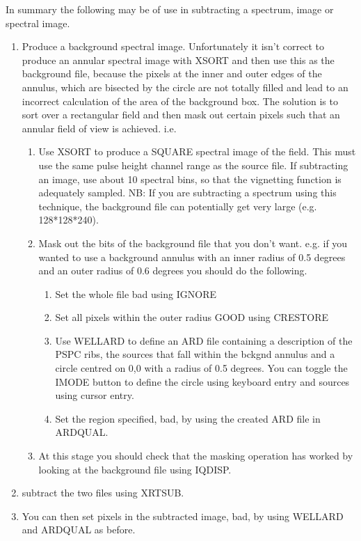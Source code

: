 \documentclass{book}
\renewcommand{\_}{{\tt\char'137}}     %
\begin{document}
In summary the following may be of use in subtracting a spectrum,
image or spectral image.
 
 
\begin{enumerate}
\item Produce a background spectral image. Unfortunately it isn't
correct to produce an annular spectral image with XSORT and then
use this as the background file, because the pixels at the inner and
outer edges of the annulus, which are bisected by the circle are
not totally filled and lead to an incorrect calculation of the area
of the background box. The solution is to sort over a rectangular
field and then mask out certain pixels such that an annular field
of view is achieved. i.e.
 
\begin{enumerate}
\item Use XSORT to produce a SQUARE spectral image of the field. This
must use the same pulse height channel range as the source file.
If subtracting an image, use about 10 spectral bins, so that the
vignetting function is adequately sampled. NB: If you are
subtracting a spectrum using this technique, the background file
can potentially get very large (e.g. 128*128*240).
\item Mask out the bits of the background file that you don't want.
e.g. if you wanted to use a background annulus with an inner
radius of 0.5 degrees and an outer radius of 0.6 degrees you
should do the following.
 
\begin{enumerate}
\item Set the whole file bad using IGNORE
\item Set all pixels within the outer radius GOOD using CRESTORE
\item Use WELLARD to define an ARD file containing a description
of the PSPC ribs, the sources that fall within the bckgnd
annulus and a circle centred on 0,0 with a radius of 0.5
degrees. You can toggle the IMODE button to define the
circle using keyboard entry and sources using cursor entry.
\item Set the region specified, bad, by using the created ARD file
in ARDQUAL.
\end{enumerate}
\item At this stage you should check that the masking operation has
worked by looking at the background file using IQDISP.
\end{enumerate}
\item subtract the two files using XRTSUB.
\item You can then set pixels in the subtracted image, bad, by
using WELLARD and ARDQUAL as before.
\end{enumerate}
\end{document}
